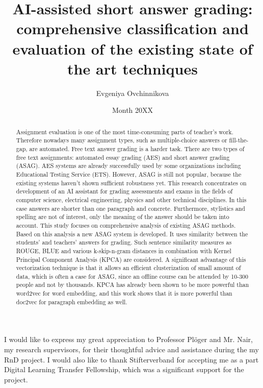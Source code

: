 \documentclass[rnd]{mas_report}
\author{Evgeniya Ovchinnikova}
\title{AI-assisted short answer grading: comprehensive classification and evaluation of the existing state of the art techniques}
\date{Month 20XX}
\begin{document}
\begin{titlepage}
    \maketitle
\end{titlepage}


\pagestyle{plain}


\cleardoublepage
\statementpage

\begin{abstract}
Assignment evaluation is one of the most time-consuming parts of teacher's work. Therefore nowadays many assignment types, such as multiple-choice answers or fill-the-gap, are automated. Free text answer grading is a harder task. There are two types of free text assignments: automated essay grading (AES) and short answer grading (ASAG). AES systems are already successfully used by some organizations including Educational Testing Service (ETS). However, ASAG is still not popular, because the existing systems haven't shown sufficient robustness yet. This research concentrates on development of an AI assistant for grading assessments and exams in the fields of computer science, electrical engineering, physics and other technical disciplines. In this case answers are shorter than one paragraph and concrete. Furthermore, stylistics and spelling are not of interest, only the meaning of the answer should be taken into account. This study focuses on comprehensive analysis of existing ASAG methods. Based on this analysis a new ASAG system is developed. It uses similarity between the students' and teachers' answers for grading. Such sentence similarity measures as ROUGE, BLUE and various k-skip-n-gram distances in combination with Kernel Principal Component Analysis (KPCA) are considered. A significant advantage of this vectorization technique is that it allows an efficient clusterization of small amount of data, which is often a case for ASAG, since an offline course can be attended by 10-300 people and not by thousands. KPCA has already been shown to be more powerful than word2vec for word embedding, and this work shows that it is more powerful than doc2vec for paragraph embedding as well.
\end{abstract}


\begin{acknowledgements}
I would like to express my great appreciation to Professor Pl{\"o}ger and Mr. Nair, my research supervisors, for their thoughtful advice and assistance during the my RnD project. I would also like to thank Stifterverband for accepting me as a part Digital Learning Transfer Fellowship, which was a significant support for the project. 
\end{acknowledgements}
\end{document}
